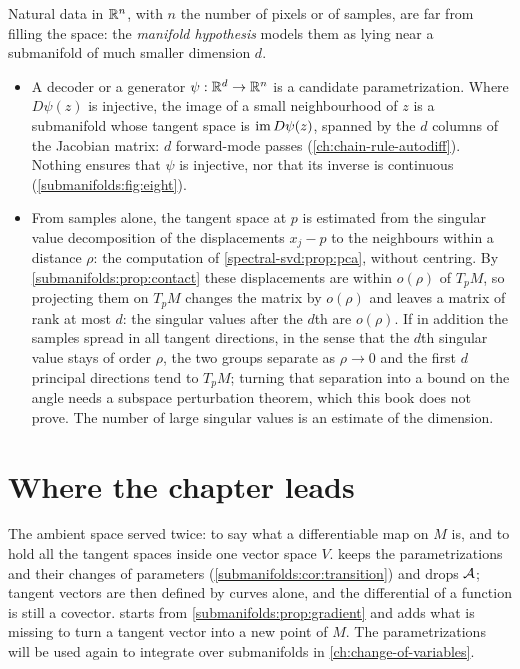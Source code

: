 \begin{notechapter}
\begin{mlthread}
Natural data in $\mathbb{R}^n$, with $n$ the number of pixels or of samples, are
far from filling the space: the \emph{manifold hypothesis} models them as
lying near a submanifold of much smaller dimension $d$.
\begin{itemize}[nosep]
  \item A decoder or a generator $\psi:\mathbb{R}^d\to\mathbb{R}^n$ is a candidate
        parametrization. Where $D\psi(z)$ is injective, the image of a
        small neighbourhood of $z$ is a submanifold whose tangent space
        is $\operatorname{im} D\psi(z)$, spanned by the $d$ columns of the Jacobian
        matrix: $d$ forward-mode passes
        (\cref{ch:chain-rule-autodiff}). Nothing ensures that $\psi$ is
        injective, nor that its inverse is continuous
        (\cref{submanifolds:fig:eight}).
  \item From samples alone, the tangent space at $p$ is estimated from
        the singular value decomposition of the displacements $x_j - p$
        to the neighbours within a distance $\rho$: the computation of
        \cref{spectral-svd:prop:pca}, without centring. By
        \cref{submanifolds:prop:contact} these displacements are within
        $o(\rho)$ of $T_pM$, so projecting them on $T_pM$ changes the
        matrix by $o(\rho)$ and leaves a matrix of rank at most $d$:
        the singular values after the $d$th are $o(\rho)$. If in
        addition the samples spread in all tangent directions, in the
        sense that the $d$th singular value stays of order $\rho$, the
        two groups separate as $\rho\to0$ and the first $d$ principal
        directions tend to $T_pM$; turning that separation into a
        bound on the angle needs a subspace perturbation theorem,
        which this book does not prove. The number of large singular
        values is an estimate of the dimension.
\end{itemize}
\end{mlthread}

\section{Where the chapter leads}\label{submanifolds:sec:outlook}

The ambient space served twice: to say what a differentiable map on $M$
is, and to hold all the tangent spaces inside one vector space $V$.
 keeps the parametrizations and their changes of
parameters (\cref{submanifolds:cor:transition}) and drops $\mathcal{A}$; tangent
vectors are then defined by curves alone, and the differential of a
function is still a covector.  starts
from \cref{submanifolds:prop:gradient} and adds what is missing to turn a
tangent vector into a new point of $M$. The parametrizations will be used
again to integrate over submanifolds in \cref{ch:change-of-variables}.


\end{notechapter}
